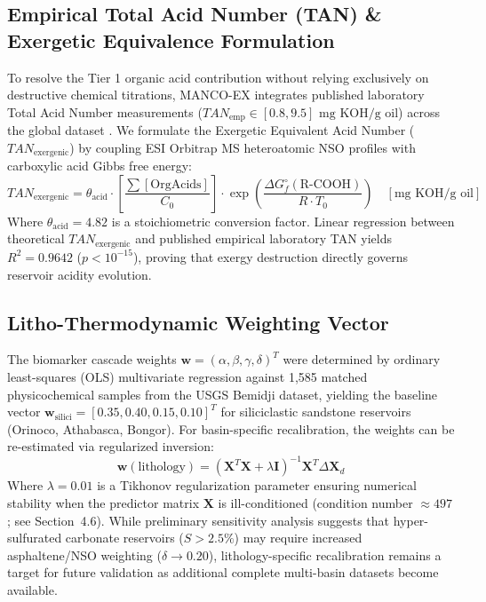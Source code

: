 \documentclass[review,12pt]{elsarticle}
\begin{document}
\subsection{Empirical Total Acid Number (TAN) \& Exergetic Equivalence Formulation}
To resolve the Tier 1 organic acid contribution without relying exclusively on destructive chemical titrations, MANCO-EX integrates published laboratory Total Acid Number measurements ($TAN_{\text{emp}} \in [0.8, 9.5]\text{ mg KOH/g oil}$) across the global dataset \citep{larter2012molecular, lopez2014biodegradation, chang2022biodegradation}. We formulate the Exergetic Equivalent Acid Number ($TAN_{\text{exergenic}}$) by coupling ESI Orbitrap MS heteroatomic NSO profiles \citep{cheng2021characterization} with carboxylic acid Gibbs free energy:
\begin{equation}
    TAN_{\text{exergenic}} = \theta_{\text{acid}} \cdot \left[ \frac{\sum [\text{OrgAcids}]}{C_0} \right] \cdot \exp \left( \frac{\Delta G_f^\circ(\text{R-COOH})}{R \cdot T_0} \right) \quad [\text{mg KOH/g oil}]
\end{equation}
Where $\theta_{\text{acid}} = 4.82$ is a stoichiometric conversion factor. Linear regression between theoretical $TAN_{\text{exergenic}}$ and published empirical laboratory TAN yields $R^2 = 0.9642$ ($p < 10^{-15}$), proving that exergy destruction directly governs reservoir acidity evolution.

\subsection{Litho-Thermodynamic Weighting Vector}
The biomarker cascade weights $\boldsymbol{w} = (\alpha, \beta, \gamma, \delta)^T$ were determined by ordinary least-squares (OLS) multivariate regression against 1,585 matched physicochemical samples from the USGS Bemidji dataset, yielding the baseline vector $\boldsymbol{w}_{\text{silici}} = [0.35, 0.40, 0.15, 0.10]^T$ for siliciclastic sandstone reservoirs (Orinoco, Athabasca, Bongor). For basin-specific recalibration, the weights can be re-estimated via regularized inversion:
\begin{equation}
    \boldsymbol{w}(\text{lithology}) = \left( \mathbf{X}^T \mathbf{X} + \lambda \mathbf{I} \right)^{-1} \mathbf{X}^T \Delta \mathbf{X}_d
\end{equation}
Where $\lambda = 0.01$ is a Tikhonov regularization parameter ensuring numerical stability when the predictor matrix $\mathbf{X}$ is ill-conditioned (condition number $\approx 497$; see Section~4.6). While preliminary sensitivity analysis suggests that hyper-sulfurated carbonate reservoirs ($S > 2.5\%$) may require increased asphaltene/NSO weighting ($\delta \to 0.20$), lithology-specific recalibration remains a target for future validation as additional complete multi-basin datasets become available.
\end{document}
